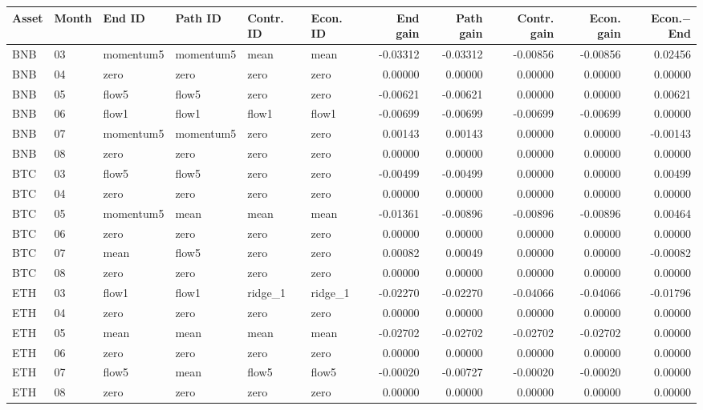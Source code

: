 \begin{longtable}{llllllrrrrr}
\toprule
Asset & Month & End ID & Path ID & Contr. ID & Econ. ID & End gain & Path gain & Contr. gain & Econ. gain & Econ.$-$End \\
\midrule
\endhead
BNB & 03 & momentum5 & momentum5 & mean & mean & -0.03312 & -0.03312 & -0.00856 & -0.00856 & 0.02456 \\
BNB & 04 & zero & zero & zero & zero & 0.00000 & 0.00000 & 0.00000 & 0.00000 & 0.00000 \\
BNB & 05 & flow5 & flow5 & zero & zero & -0.00621 & -0.00621 & 0.00000 & 0.00000 & 0.00621 \\
BNB & 06 & flow1 & flow1 & flow1 & flow1 & -0.00699 & -0.00699 & -0.00699 & -0.00699 & 0.00000 \\
BNB & 07 & momentum5 & momentum5 & zero & zero & 0.00143 & 0.00143 & 0.00000 & 0.00000 & -0.00143 \\
BNB & 08 & zero & zero & zero & zero & 0.00000 & 0.00000 & 0.00000 & 0.00000 & 0.00000 \\
BTC & 03 & flow5 & flow5 & zero & zero & -0.00499 & -0.00499 & 0.00000 & 0.00000 & 0.00499 \\
BTC & 04 & zero & zero & zero & zero & 0.00000 & 0.00000 & 0.00000 & 0.00000 & 0.00000 \\
BTC & 05 & momentum5 & mean & mean & mean & -0.01361 & -0.00896 & -0.00896 & -0.00896 & 0.00464 \\
BTC & 06 & zero & zero & zero & zero & 0.00000 & 0.00000 & 0.00000 & 0.00000 & 0.00000 \\
BTC & 07 & mean & flow5 & zero & zero & 0.00082 & 0.00049 & 0.00000 & 0.00000 & -0.00082 \\
BTC & 08 & zero & zero & zero & zero & 0.00000 & 0.00000 & 0.00000 & 0.00000 & 0.00000 \\
ETH & 03 & flow1 & flow1 & ridge\_1 & ridge\_1 & -0.02270 & -0.02270 & -0.04066 & -0.04066 & -0.01796 \\
ETH & 04 & zero & zero & zero & zero & 0.00000 & 0.00000 & 0.00000 & 0.00000 & 0.00000 \\
ETH & 05 & mean & mean & mean & mean & -0.02702 & -0.02702 & -0.02702 & -0.02702 & 0.00000 \\
ETH & 06 & zero & zero & zero & zero & 0.00000 & 0.00000 & 0.00000 & 0.00000 & 0.00000 \\
ETH & 07 & flow5 & mean & flow5 & flow5 & -0.00020 & -0.00727 & -0.00020 & -0.00020 & 0.00000 \\
ETH & 08 & zero & zero & zero & zero & 0.00000 & 0.00000 & 0.00000 & 0.00000 & 0.00000 \\

\end{longtable}
